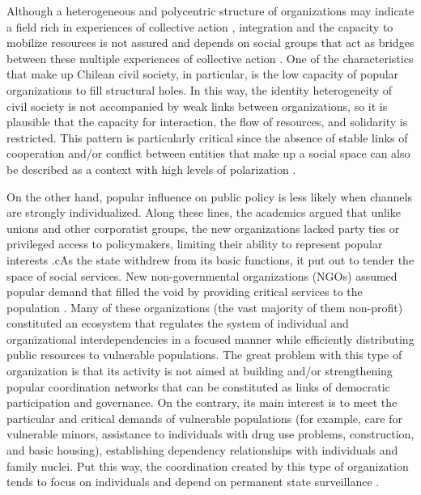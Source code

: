 Although a heterogeneous and polycentric structure of organizations may indicate a field rich in experiences of collective action \parencite{programa_de_las_naciones_unidas_para_el_desarrollo_desarrollo_2000}, integration and the capacity to mobilize resources is not assured and depends on social groups that act as bridges between these multiple experiences of collective action \parencite{baldassarri_integrative_2007, granovetter_strength_1973}. One of the characteristics that make up Chilean civil society, in particular, is the low capacity of popular organizations to fill structural holes. In this way, the identity heterogeneity of civil society is not accompanied by weak links between organizations, so it is plausible that the capacity for interaction, the flow of resources, and solidarity is restricted. This pattern is particularly critical since the absence of stable links of cooperation and/or conflict between entities that make up a social space can also be described as a context with high levels of polarization \parencite{aref_detecting_2020}.
\bigskip

On the other hand, popular influence on public policy is less likely when channels are strongly individualized. Along these lines, the academics argued that unlike unions and other corporatist groups, the new organizations lacked party ties or privileged access to policymakers, limiting their ability to represent popular interests \parencite{collier_reorganizing_2009, silva_reshaping_2018}.cAs the state withdrew from its basic functions, it put out to tender the space of social services. New non-governmental organizations (NGOs) assumed popular demand that filled the void by providing critical services to the population  \parencite{boulding_community_2020, holzner_poverty_2007}. Many of these organizations (the vast majority of them non-profit) constituted an ecosystem that regulates the system of individual and organizational interdependencies in a focused manner while efficiently distributing public resources to vulnerable populations. The great problem with this type of organization is that its activity is not aimed at building and/or strengthening popular coordination networks that can be constituted as links of democratic participation and governance. On the contrary, its main interest is to meet the particular and critical demands of vulnerable populations (for example, care for vulnerable minors, assistance to individuals with drug use problems, construction, and basic housing), establishing dependency relationships with individuals and family nuclei. Put this way, the coordination created by this type of organization tends to focus on individuals and depend on permanent state surveillance \parencite{delamaza_redes_2012}.
\bigskip

